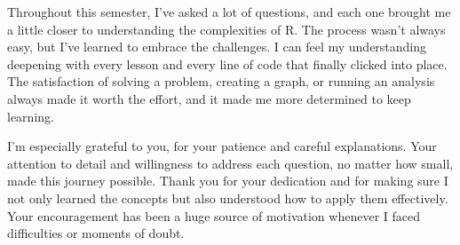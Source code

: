 \documentclass[
]{article}
\begin{document}
Throughout this semester, I've asked a lot of questions, and each one
brought me a little closer to understanding the complexities of R. The
process wasn't always easy, but I've learned to embrace the challenges.
I can feel my understanding deepening with every lesson and every line
of code that finally clicked into place. The satisfaction of solving a
problem, creating a graph, or running an analysis always made it worth
the effort, and it made me more determined to keep learning.

I'm especially grateful to you, for your patience and careful
explanations. Your attention to detail and willingness to address each
question, no matter how small, made this journey possible. Thank you for
your dedication and for making sure I not only learned the concepts but
also understood how to apply them effectively. Your encouragement has
been a huge source of motivation whenever I faced difficulties or
moments of doubt.
\end{document}
